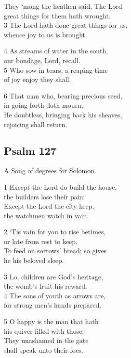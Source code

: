 \begin{multicols}{3}
They ‘mong the heathen said, The Lord\\
great things for them hath wrought.\\
3 The Lord hath done great things for us,\\
whence joy to us is brought.

4 As streams of water in the south,\\
our bondage, Lord, recall.\\
5 Who sow in tears, a reaping time\\
of joy enjoy they shall.

6 That man who, bearing precious seed,\\
in going forth doth mourn,\\
He doubtless, bringing back his sheaves,\\
rejoicing shall return.

\begin{center}
\quad{}\quad{}
\end{center}

\subsection*{Psalm 127}

A Song of degrees for Solomon.

1 Except the Lord do build the house,\\
the builders lose their pain:\\
Except the Lord the city keep,\\
the watchmen watch in vain.

2 ‘Tis vain for you to rise betimes,\\
or late from rest to keep,\\
To feed on sorrows’ bread; so gives\\
he his beloved sleep.

3 Lo, children are God’s heritage,\\
the womb’s fruit his reward.\\
4 The sons of youth as arrows are,\\
for strong men’s hands prepared.

5 O happy is the man that hath\\
his quiver filled with those;\\
They unashamed in the gate\\
shall speak unto their foes.


\end{multicols}
